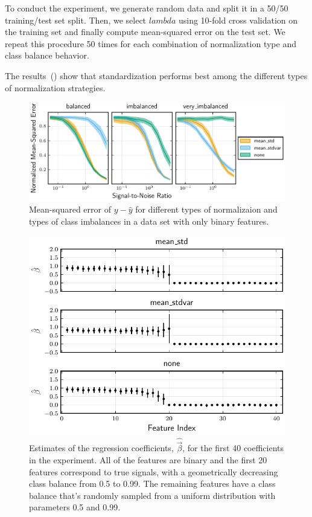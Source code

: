 To conduct the experiment, we generate random data and split it in a 50/50 training/test set split. Then, we select \(lambda\) using 10-fold cross validation on the training set and finally compute mean-squared error on the test set. We repeat this procedure 50 times for each combination of normalization type and class balance behavior.

The results~() show that standardization performs best among the different types of normalization strategies.

\begin{figure}[htpb]
  \centering
  \includegraphics[]{plots/binary_data_sim.pdf}
  \caption{%
    Mean-squared error of \(y - \hat y\) for different types of normalizaion and types of class imbalances in a data set with only binary features.
  }
  \label{fig:binary-sim}
\end{figure}

\begin{figure}[htpb]
  \centering
  \includegraphics[]{plots/binary_decreasing.pdf}
  \caption{%
    Estimates of the regression coefficients, \(\hat{\vec{\beta}}\), for the first 40 coefficients in the experiment. All of the features are binary and the first 20 features correspond to true signals, with a geometrically decreasing class balance from 0.5 to 0.99. The remaining features have a class balance that's randomly sampled from a uniform distribution with parameters 0.5 and 0.99.}
  \label{fig:binary-decreasing}
\end{figure}

